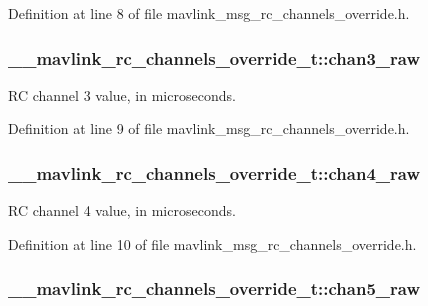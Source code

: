 Definition at line 8 of file mavlink\-\_\-msg\-\_\-rc\-\_\-channels\-\_\-override.\-h.

\hypertarget{struct____mavlink__rc__channels__override__t_aaf6d972bf21b65c73095fc5c45aff71a}{
\subsubsection[{chan3\-\_\-raw}]{ \-\_\-\-\_\-mavlink\-\_\-rc\-\_\-channels\-\_\-override\-\_\-t\-::chan3\-\_\-raw}}\label{struct____mavlink__rc__channels__override__t_aaf6d972bf21b65c73095fc5c45aff71a}


R\-C channel 3 value, in microseconds. 



Definition at line 9 of file mavlink\-\_\-msg\-\_\-rc\-\_\-channels\-\_\-override.\-h.

\hypertarget{struct____mavlink__rc__channels__override__t_afc315c11bfffdd9aa051799c5d2d0fae}{
\subsubsection[{chan4\-\_\-raw}]{ \-\_\-\-\_\-mavlink\-\_\-rc\-\_\-channels\-\_\-override\-\_\-t\-::chan4\-\_\-raw}}\label{struct____mavlink__rc__channels__override__t_afc315c11bfffdd9aa051799c5d2d0fae}


R\-C channel 4 value, in microseconds. 



Definition at line 10 of file mavlink\-\_\-msg\-\_\-rc\-\_\-channels\-\_\-override.\-h.

\hypertarget{struct____mavlink__rc__channels__override__t_a97c62336395d208d02837ca92085f3ac}{
\subsubsection[{chan5\-\_\-raw}]{ \-\_\-\-\_\-mavlink\-\_\-rc\-\_\-channels\-\_\-override\-\_\-t\-::chan5\-\_\-raw}}\label{struct____mavlink__rc__channels__override__t_a97c62336395d208d02837ca92085f3ac}


